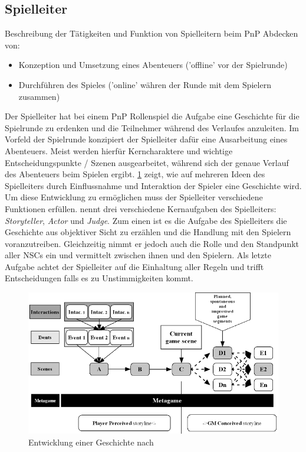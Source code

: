 \subsection{Spielleiter}
\label{sec:Spielleiter}
Beschreibung der Tätigkeiten und Funktion von Spielleitern beim PnP\newline
Abdecken von:
\begin{itemize}
	\item Konzeption und Umsetzung eines Abenteuers ('offline' vor der Spielrunde)
	\item Durchführen des Spieles ('online' währen der Runde mit dem Spielern zusammen)
\end{itemize}
Der Spielleiter hat bei einem PnP Rollenspiel die Aufgabe eine Geschichte für die Spielrunde zu erdenken und die Teilnehmer während des Verlaufes anzuleiten. Im Vorfeld der Spielrunde konzipiert der Spielleiter dafür eine Ausarbeitung eines Abenteuers. Meist werden hierfür Kerncharaktere und wichtige Entscheidungspunkte / Szenen ausgearbeitet, während sich der genaue Verlauf des Abenteuers beim Spielen ergibt. \ref{fig:storyflow_pnp} zeigt, wie auf mehreren Ideen des Spielleiters durch Einflussnahme und Interaktion der Spieler eine Geschichte wird. Um diese Entwicklung zu ermöglichen muss der Spielleiter verschiedene Funktionen erfüllen.\newline
\cite{Arinbjarnar} nennt drei verschiedene Kernaufgaben des Spielleiters: \emph{Storyteller}, \emph{Actor} und \emph{Judge}. Zum einen ist es die Aufgabe des Spielleiters die Geschichte aus objektiver Sicht zu erzählen und die Handlung mit den Spielern voranzutreiben. Gleichzeitig nimmt er jedoch auch die Rolle und den Standpunkt aller NSCs ein und vermittelt zwischen ihnen und den Spielern. Als letzte Aufgabe achtet der Spielleiter auf die Einhaltung aller Regeln und trifft Entscheidungen falls es zu Unstimmigkeiten kommt.
\begin{figure}
	\centering
		\includegraphics[width=1.00\textwidth]{media/storyflow_pnp.png}
	\caption{Entwicklung einer Geschichte nach \cite{Tychsen2006a}}
	\label{fig:storyflow_pnp}
\end{figure}




